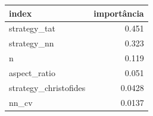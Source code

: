 \begin{tabular}{lr}
\hline
index & importância \\
\hline
strategy\_tat & 0.451 \\
strategy\_nn & 0.323 \\
n & 0.119 \\
aspect\_ratio & 0.051 \\
strategy\_christofides & 0.0428 \\
nn\_cv & 0.0137 \\
\hline
\end{tabular}
